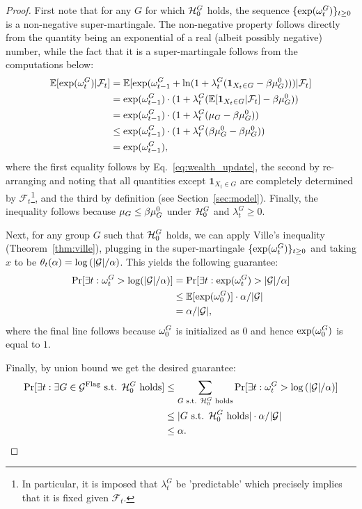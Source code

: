\begin{proof} First note that for any $G$ for which ${\mathcal{H}_0^G}$ holds, the sequence $\{\exp(\omega_t^G)\}_{t\geq 0}$ is a non-negative super-martingale. The non-negative property follows directly from the quantity being an exponential of a real (albeit possibly negative) number, while the fact that it is a super-martingale follows from the computations below:
\begin{align*}
    \mathbb{E}[\exp(\omega_t^G)|\mathcal{F}_t] 
    &= \mathbb{E}[\exp(\omega_{t-1}^G + \ln(1+\lambda_t^G(\mathbf{1}_{X_t\in G} - \beta {\mu_G^0})))|\mathcal{F}_t]
    \\&= \exp(\omega_{t-1}^G) \cdot (1+\lambda_t^G(\mathbb{E}[\mathbf{1}_{X_t\in G}|\mathcal{F}_t] - \beta {\mu_G^0})) 
    \\&= \exp(\omega_{t-1}^G) \cdot (1+\lambda_t^G(\mu_G - \beta {\mu_G^0}) )
    \\&\leq \exp(\omega_{t-1}^G) \cdot (1+\lambda_t^G(\beta {\mu_G^0} - \beta {\mu_G^0}) )
    \\&= \exp(\omega_{t-1}^G),
\end{align*}
where the first equality follows by Eq.~\ref{eq:wealth_update}, the second by re-arranging and noting that all quantities except $\mathbf{1}_{X_t\in G}$ are completely determined by $\mathcal{F}_t$\footnote{In particular, it is imposed that $\lambda_t^G$ be 'predictable' which precisely implies that it is fixed given $\mathcal{F}_t$.}, and the third by definition (see Section~\ref{sec:model}). Finally, the inequality follows because $\mu_G \leq \beta{\mu_G^0}$ under ${\mathcal{H}_0^G}$ and $\lambda_t^G \geq 0$.

Next, for any group $G$ such that ${\mathcal{H}_0^G}$ holds, we can apply Ville's inequality (Theorem~\ref{thm:ville}), plugging in the super-martingale $\{\exp(\omega_t^G)\}_{t\geq 0}$ and taking $x$ to be $\theta_t(\alpha) = \log{(|{\mathcal{G}}|/\alpha)}$. This yields the following guarantee: 
\begin{align*}
\Pr[\exists t: \omega_t^{G} > \log(|{\mathcal{G}}|/\alpha)] &= \Pr[\exists t: \exp(\omega_t^{G}) > |{\mathcal{G}}|/\alpha] 
\\&\leq \mathbb{E}[\exp(\omega_0^{G})] \cdot \alpha/|{\mathcal{G}}| 
\\&= \alpha/|{\mathcal{G}}|,
\end{align*}
where the final line follows because $\omega_0^{G}$ is initialized as $0$ and hence $\exp(\omega_0^{G})$ is equal to $1$.

Finally, by union bound we get the desired guarantee:
\begin{align*}
\Pr[\exists t: \exists G \in {\mathcal {G}^{\text{Flag}}} \text{ s.t. } {\mathcal{H}_0^G} \text{ holds}] &\leq \sum_{G \text{ s.t. }{\mathcal{H}_0^G} \text{ holds}} \Pr[\exists t: \omega_t^G > \log{(|{\mathcal{G}}|/\alpha)}] \\
&\leq |G \text{ s.t. }{\mathcal{H}_0^G} \text{ holds}| \cdot \alpha / |{\mathcal{G}}|\\
&\leq \alpha.
\end{align*}
\end{proof}

